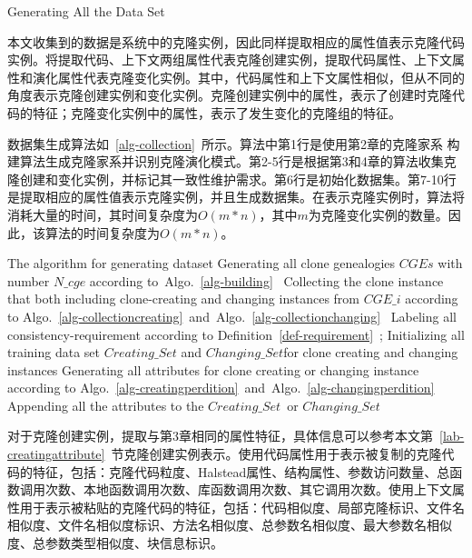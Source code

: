 {Generating All the Data Set}

本文收集到的数据是系统中的克隆实例，因此同样提取相应的属性值表示克隆代码实例。将提取代码、上下文两组属性代表克隆创建实例，提取代码属性、上下文属性和演化属性代表克隆变化实例。其中，代码属性和上下文属性相似，但从不同的角度表示克隆创建实例和变化实例。克隆创建实例中的属性，表示了创建时克隆代码的特征；克隆变化实例中的属性，表示了发生变化的克隆组的特征。

数据集生成算法如~\ref{alg-collection}~所示。算法中第1行是使用第2章的克隆家系 构建算法生成克隆家系并识别克隆演化模式。第2-5行是根据第3和4章的算法收集克隆创建和变化实例，并标记其一致性维护需求。第6行是初始化数据集。第7-10行是提取相应的属性值表示克隆实例，并且生成数据集。在表示克隆实例时，算法将消耗大量的时间，其时间复杂度为$O(m*n)$，其中$m$为克隆变化实例的数量。因此，该算法的时间复杂度为$O(m*n)$。

\vspace{1em}
\begin{minipage}{0.8\textwidth}
\centering
\begin{algorithm}[H]
 {The algorithm for generating dataset}
\label{alg-collection}
Generating all clone genealogies $CGEs$ with number $N\_cge$ according to~Algo.~\ref{alg-building}~\;
{ 
 Collecting the clone instance that both including clone-creating and changing instances from $CGE\_i$ according to Algo.~\ref{alg-collectioncreating}~and~Algo.~\ref{alg-collectionchanging}~\; 
 Labeling all consistency-requirement according to Definition~\ref{def-requirement}~;
}
Initializing all training data set $Creating\_Set$ and $Changing\_Set$for clone creating and changing instances\; 
{ 
Generating all attributes for clone creating or changing instance according to Algo.~\ref{alg-creatingperdition}~and~Algo.~\ref{alg-changingperdition}~\;
Appending all the attributes to the $Creating\_Set$\ or $Changing\_Set$\;
}
\end{algorithm}
\end{minipage}
\vspace{1em}

对于克隆创建实例，提取与第3章相同的属性特征，具体信息可以参考本文第~\ref{lab-creatingattribute}~节克隆创建实例表示。使用代码属性用于表示被复制的克隆代码的特征，包括：克隆代码粒度、Halstead属性、结构属性、参数访问数量、总函数调用次数、本地函数调用次数、库函数调用次数、其它调用次数。使用上下文属性用于表示被粘贴的克隆代码的特征，包括：代码相似度、局部克隆标识、文件名相似度、文件名相似度标识、方法名相似度、总参数名相似度、最大参数名相似度、总参数类型相似度、块信息标识。

